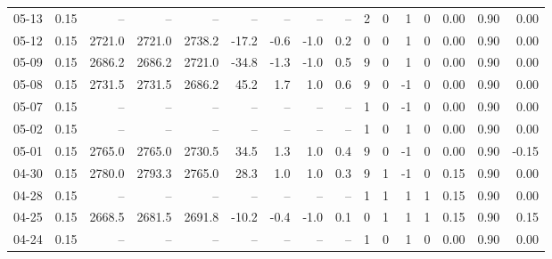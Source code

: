 \begin{threeparttable}
{\begin{tabular}{lrrrrrrrrrrrrrrr}
  05-13 &     0.15 &     -- &     -- &     -- &         -- &             -- &                       -- &                  -- &              2 &         0 &     1 &         0 &       0.00 &      0.90 &           0.00 \\
  05-12 &     0.15 & 2721.0 & 2721.0 & 2738.2 &      -17.2 &           -0.6 &                     -1.0 &                 0.2 &              0 &         0 &     1 &         0 &       0.00 &      0.90 &           0.00 \\
  05-09 &     0.15 & 2686.2 & 2686.2 & 2721.0 &      -34.8 &           -1.3 &                     -1.0 &                 0.5 &              9 &         0 &     1 &         0 &       0.00 &      0.90 &           0.00 \\
  05-08 &     0.15 & 2731.5 & 2731.5 & 2686.2 &       45.2 &            1.7 &                      1.0 &                 0.6 &              9 &         0 &    -1 &         0 &       0.00 &      0.90 &           0.00 \\
  05-07 &     0.15 &     -- &     -- &     -- &         -- &             -- &                       -- &                  -- &              1 &         0 &    -1 &         0 &       0.00 &      0.90 &           0.00 \\
  05-02 &     0.15 &     -- &     -- &     -- &         -- &             -- &                       -- &                  -- &              1 &         0 &     1 &         0 &       0.00 &      0.90 &           0.00 \\
  05-01 &     0.15 & 2765.0 & 2765.0 & 2730.5 &       34.5 &            1.3 &                      1.0 &                 0.4 &              9 &         0 &    -1 &         0 &       0.00 &      0.90 &          -0.15 \\
  04-30 &     0.15 & 2780.0 & 2793.3 & 2765.0 &       28.3 &            1.0 &                      1.0 &                 0.3 &              9 &         1 &    -1 &         0 &       0.15 &      0.90 &           0.00 \\
  04-28 &     0.15 &     -- &     -- &     -- &         -- &             -- &                       -- &                  -- &              1 &         1 &     1 &         1 &       0.15 &      0.90 &           0.00 \\
  04-25 &     0.15 & 2668.5 & 2681.5 & 2691.8 &      -10.2 &           -0.4 &                     -1.0 &                 0.1 &              0 &         1 &     1 &         1 &       0.15 &      0.90 &           0.15 \\
  04-24 &     0.15 &     -- &     -- &     -- &         -- &             -- &                       -- &                  -- &              1 &         0 &     1 &         0 &       0.00 &      0.90 &           0.00 \\

\end{tabular}}
\end{threeparttable}
